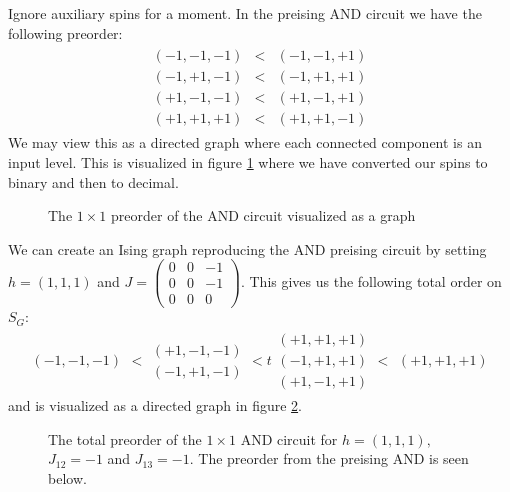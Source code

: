 Ignore auxiliary spins for a moment. In the preising AND circuit we have the following preorder:
\begin{align*}
\begin{array}{ccc}
	(-1,-1,-1) & < & (-1,-1,+1) \\
	(-1,+1,-1) & < & (-1,+1,+1) \\
	(+1,-1,-1) & < & (+1,-1,+1) \\
	(+1,+1,+1) & < & (+1,+1,-1)
\end{array}
\end{align*}
We may view this as a directed graph where each connected component is an input level. This is visualized in figure \ref{fig:AND_1x1x0_preorder} where we have converted our spins to binary and then to decimal.
\begin{figure}[ht]
    \centering
    \begin{Huge}
    \end{Huge}
	\bigskip
	\caption{The $1\times 1$ preorder of the AND circuit visualized as a graph}
    \label{fig:AND_1x1x0_preorder}
\end{figure}
We can create an Ising graph reproducing the AND preising circuit by setting $h = (1,1,1)$ and $J = \left(\begin{smallmatrix}0 & 0 & -1 \\ 0 & 0 & -1 \\ 0 & 0 & 0\end{smallmatrix}\right)$. This gives us the following total order on $S_G$: 
\begin{align*}
\begin{array}{c}
	(-1,-1,-1)
\end{array} <
\begin{array}{c}
	(+1,-1,-1) \\
	(-1,+1,-1)
\end{array} <t
\begin{array}{c}
	(+1,+1,+1) \\
	(-1,+1,+1) \\
	(+1,-1,+1)
\end{array} <
\begin{array}{c}
	(+1,+1,+1)
\end{array}
\end{align*}
and is visualized as a directed graph in figure \ref{fig:AND_1x1x0_total-preorder}. 
\begin{figure}[ht]
    \centering
    \begin{Huge}
    \end{Huge}
	\bigskip
	\caption{The total preorder of the $1\times 1$ AND circuit for $h = (1,1,1),$ $J_{12} = -1$ and $J_{13} = -1$. The preorder from the preising AND is seen below.}
    \label{fig:AND_1x1x0_total-preorder}
\end{figure}

